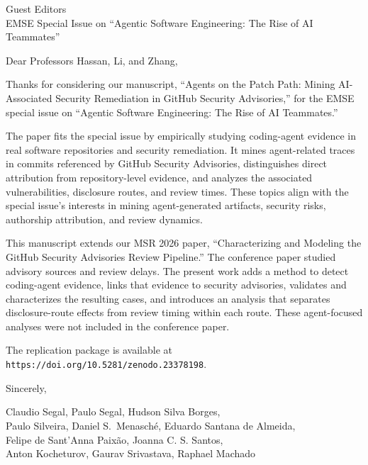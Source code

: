 \documentclass[11pt]{letter}
\begin{document}
\begin{letter}{Guest Editors\\
EMSE Special Issue on ``Agentic Software Engineering: The Rise of AI Teammates''}

\date{October 20, 2026}

\vspace{1in}

\opening{Dear Professors Hassan, Li, and Zhang,}

Thanks for considering our manuscript, ``Agents on the Patch Path: Mining AI-Associated Security Remediation in GitHub Security Advisories,'' for the EMSE special issue on ``Agentic Software Engineering: The Rise of AI Teammates.''

The paper fits the special issue by empirically studying coding-agent evidence in real software repositories and security remediation. It mines agent-related traces in commits referenced by GitHub Security Advisories, distinguishes direct attribution from repository-level evidence, and analyzes the associated vulnerabilities, disclosure routes, and review times. These topics align with the special issue's interests in mining agent-generated artifacts, security risks, authorship attribution, and review dynamics.

This manuscript extends our MSR 2026 paper, ``Characterizing and Modeling the GitHub Security Advisories Review Pipeline.'' The conference paper studied advisory sources and review delays. The present work adds a   method to detect coding-agent evidence, links that evidence to security advisories, validates and characterizes the resulting cases, and introduces an analysis that separates disclosure-route effects from review timing within each route. These agent-focused analyses were not included in the conference paper.

The replication package is available at
\texttt{https://doi.org/10.5281/zenodo.23378198}.

\vspace{1in}
\closing{Sincerely,}

Claudio Segal, Paulo Segal, Hudson Silva Borges, \\
        Paulo Silveira, Daniel S.\ Menasch\'e,  Eduardo Santana de Almeida, \\   Felipe de Sant'Anna Paixão, Joanna C. S. Santos, \\ Anton Kocheturov, Gaurav Srivastava, Raphael Machado

\end{letter}
\end{document}
